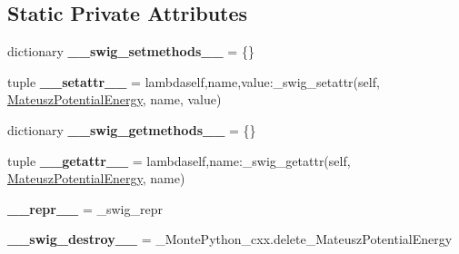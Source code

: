 \subsection*{Static Private Attributes}
\begin{DoxyCompactItemize}
\item 
\hypertarget{classMontePython__cxx_1_1MateuszPotentialEnergy_a4602d1eb20498bb085a4fcece953b842}{}dictionary {\bfseries \+\_\+\+\_\+swig\+\_\+setmethods\+\_\+\+\_\+} = \{\}\label{classMontePython__cxx_1_1MateuszPotentialEnergy_a4602d1eb20498bb085a4fcece953b842}

\item 
\hypertarget{classMontePython__cxx_1_1MateuszPotentialEnergy_ae58cbfd02c7150eacd37fc96b03b5389}{}tuple {\bfseries \+\_\+\+\_\+setattr\+\_\+\+\_\+} = lambdaself,name,value\+:\+\_\+swig\+\_\+setattr(self, \hyperlink{classMontePython__cxx_1_1MateuszPotentialEnergy}{Mateusz\+Potential\+Energy}, name, value)\label{classMontePython__cxx_1_1MateuszPotentialEnergy_ae58cbfd02c7150eacd37fc96b03b5389}

\item 
\hypertarget{classMontePython__cxx_1_1MateuszPotentialEnergy_a288108983c3a137de3e1bf47b3b2bd0b}{}dictionary {\bfseries \+\_\+\+\_\+swig\+\_\+getmethods\+\_\+\+\_\+} = \{\}\label{classMontePython__cxx_1_1MateuszPotentialEnergy_a288108983c3a137de3e1bf47b3b2bd0b}

\item 
\hypertarget{classMontePython__cxx_1_1MateuszPotentialEnergy_a7225991c5ed16702697aa26c59875bf8}{}tuple {\bfseries \+\_\+\+\_\+getattr\+\_\+\+\_\+} = lambdaself,name\+:\+\_\+swig\+\_\+getattr(self, \hyperlink{classMontePython__cxx_1_1MateuszPotentialEnergy}{Mateusz\+Potential\+Energy}, name)\label{classMontePython__cxx_1_1MateuszPotentialEnergy_a7225991c5ed16702697aa26c59875bf8}

\item 
\hypertarget{classMontePython__cxx_1_1MateuszPotentialEnergy_a9b1d5e0cf78196e10c4f774e3c1de679}{}{\bfseries \+\_\+\+\_\+repr\+\_\+\+\_\+} = \+\_\+swig\+\_\+repr\label{classMontePython__cxx_1_1MateuszPotentialEnergy_a9b1d5e0cf78196e10c4f774e3c1de679}

\item 
\hypertarget{classMontePython__cxx_1_1MateuszPotentialEnergy_a6df330cd9ea8624dd38aa103bed30654}{}{\bfseries \+\_\+\+\_\+swig\+\_\+destroy\+\_\+\+\_\+} = \+\_\+\+Monte\+Python\+\_\+cxx.\+delete\+\_\+\+Mateusz\+Potential\+Energy\label{classMontePython__cxx_1_1MateuszPotentialEnergy_a6df330cd9ea8624dd38aa103bed30654}

\end{DoxyCompactItemize}


